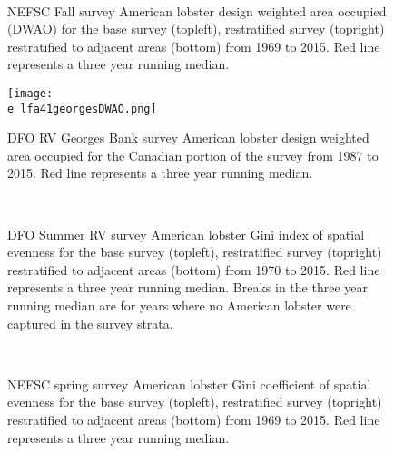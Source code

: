 \documentclass[11pt]{article}
\newcommand{\e}{/backup/bio_data/bio.lobster/figures/} %
\begin{document}
\begin{figure}
\centering
{}
\\
\caption{NEFSC Fall survey American lobster design weighted area occupied (DWAO) for the base survey (topleft), restratified survey (topright) restratified to adjacent areas (bottom) from 1969 to 2015. Red line represents a three year running median. }
\end{figure}
\clearpage


\begin{figure}

    \texttt{[image: \\e lfa41georgesDWAO.png]}
    \caption{DFO RV Georges Bank survey American lobster design weighted area occupied for the Canadian portion of the survey from 1987 to 2015. Red line represents a three year running median. }

\end{figure}


\begin{figure}
\centering
{}
\\
\caption{DFO Summer RV survey American lobster Gini index of spatial evenness for the base survey (topleft), restratified survey (topright) restratified to adjacent areas (bottom) from 1970 to 2015. Red line represents a three year running median. Breaks in the three year running median are for years where no American lobster were captured in the survey strata.}
\end{figure}
\clearpage


\begin{figure}
\centering
{}
\\
\caption{NEFSC spring survey American lobster Gini coefficient of spatial evenness for the base survey (topleft), restratified survey (topright) restratified to adjacent areas (bottom) from 1969 to 2015. Red line represents a three year running median.  }
\end{figure}
\clearpage
\end{document}
